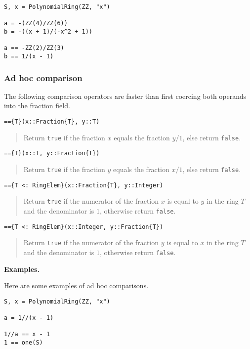 \documentclass[a4paper,10pt]{article}
\newcommand{\code}{\lstinline}
\newcommand{\desc}[1]{\vspace{-3mm}\begin{quote}#1\end{quote}}
\begin{document}
\begin{lstlisting}
S, x = PolynomialRing(ZZ, "x")

a = -(ZZ(4)/ZZ(6))
b = -((x + 1)/(-x^2 + 1))

a == -ZZ(2)/ZZ(3)
b == 1/(x - 1)
\end{lstlisting}

\subsubsection{Ad hoc comparison}

The following comparison operators are faster than first coercing both
operands into the fraction field.

\begin{lstlisting}
=={T}(x::Fraction{T}, y::T)
\end{lstlisting}

\desc{Return \code{true} if the fraction $x$ equals the fraction $y/1$, else
return \code{false}.}

\begin{lstlisting}
=={T}(x::T, y::Fraction{T})
\end{lstlisting}

\desc{Return \code{true} if the fraction $y$ equals the fraction $x/1$, else
return \code{false}.}

\begin{lstlisting}
=={T <: RingElem}(x::Fraction{T}, y::Integer)
\end{lstlisting}

\desc{Return \code{true} if the numerator of the fraction $x$ is equal to $y$
in the ring $T$ and the denominator is $1$, otherwise return \code{false}.}

\begin{lstlisting}
=={T <: RingElem}(x::Integer, y::Fraction{T})
\end{lstlisting}

\desc{Return \code{true} if the numerator of the fraction $y$ is equal to $x$
in the ring $T$ and the denominator is $1$, otherwise return \code{false}.}

\textbf{Examples.}

Here are some examples of ad hoc comparisons.

\begin{lstlisting}
S, x = PolynomialRing(ZZ, "x")

a = 1//(x - 1)

1//a == x - 1
1 == one(S)
\end{lstlisting}
\end{document}
